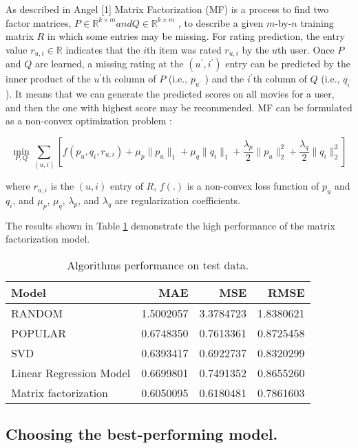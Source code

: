 \documentclass[
]{article}
\begin{document}
As described in Angel {[}1{]} Matrix Factorization (MF) is a process to find two factor matrices, \(P\in \mathbb{R}^{k\times m} and Q \in \mathbb{R}^{k\times m}\) , to describe a given \(m\)-by-\(n\) training matrix \(R\) in which some entries may be missing.
For rating prediction, the entry value \(r_{u,i}\in \mathbb{R}\) indicates that the \(i\)th item was rated \(r_{u,i}\) by the \(u\)th user. Once \(P\) and \(Q\) are learned, a missing rating at the \((u^{\prime}, i^{\prime})\) entry can be predicted by the inner product of the \(u^{\prime}\)th column of \(P\) (i.e., \(p_{u^{\prime}}\) ) and the \(i^{\prime}\)th column of \(Q\) (i.e., \(q_{i^{\prime}}\) ). It means that we can generate the predicted scores on all movies for a user, and then the one with highest score may be recommended. MF can be formulated as a non-convex optimization problem :

\begin{equation}
    \min_{P,Q} \sum_{(u,i)}\left[ f(p_{u},q_{i},r_{u,i}) + \mu_{p}\|p_{u}\|_{1} + \mu_{q}\|q_{i}\|_{1} + \frac{\lambda_{p}}{2}\|p_{u}\|_{2}^{2} + \frac{\lambda_{q}}{2}\|q_{i}\|_{2}^{2}\right] 
    \label{eq:modelC}
\end{equation}

where \(r_{u,i}\) is the \((u, i)\) entry of \(R\), \(f (.)\) is a non-convex loss function of \(p_{u}\) and \(q_{i}\), and \(\mu_{p}\),
\(\mu_{q}\), \(\lambda_{p}\), and \(\lambda_{q}\) are regularization coefficients.

The results shown in Table \ref{tab:modelC2} demonstrate the high performance of the matrix factorization model.

\begin{table}[H]
\centering
\caption{\label{tab:modelC2}Algorithms performance on test data.}
\centering
\begin{tabular}[t]{lrrr}
\toprule
Model & MAE & MSE & RMSE\\
\midrule
RANDOM & 1.5002057 & 3.3784723 & 1.8380621\\
POPULAR & 0.6748350 & 0.7613361 & 0.8725458\\
SVD & 0.6393417 & 0.6922737 & 0.8320299\\
Linear Regression Model & 0.6699801 & 0.7491352 & 0.8655260\\
Matrix factorization & 0.6050095 & 0.6180481 & 0.7861603\\
\bottomrule
\end{tabular}
\end{table}

\subsection{Choosing the best-performing model.}\label{choosing-the-best-performing-model.}
\end{document}

